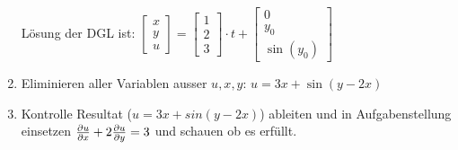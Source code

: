 \begin{enumerate}
	Lösung der DGL ist: $\begin{bmatrix}x\\y\\u\end{bmatrix}=\begin{bmatrix}1\\2\\3\end{bmatrix}\cdot t+ \begin{bmatrix}0\\y_0\\\sin(y_0)\end{bmatrix}$\\
	
	\item Eliminieren aller Variablen ausser $u,x,y$: $u=3x+\sin(y-2x)$
	\item Kontrolle
	Resultat ($u=3x+sin(y-2x)$) ableiten und in Aufgabenstellung einsetzen $\frac{\partial u}{\partial x}+2\frac{\partial u}{\partial y}=3$ und schauen ob es erfüllt.
	
\end{enumerate}


